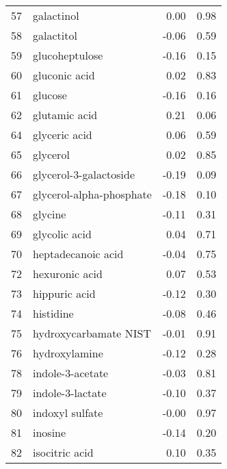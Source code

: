 \begin{tabular}{llrr}
57  &                         galactinol &                 0.00 &     0.98 \\
58  &                         galactitol &                -0.06 &     0.59 \\
59  &                     glucoheptulose &                -0.16 &     0.15 \\
60  &                      gluconic acid &                 0.02 &     0.83 \\
61  &                            glucose &                -0.16 &     0.16 \\
62  &                      glutamic acid &                 0.21 &     0.06 \\
64  &                      glyceric acid &                 0.06 &     0.59 \\
65  &                           glycerol &                 0.02 &     0.85 \\
66  &             glycerol-3-galactoside &                -0.19 &     0.09 \\
67  &           glycerol-alpha-phosphate &                -0.18 &     0.10 \\
68  &                            glycine &                -0.11 &     0.31 \\
69  &                      glycolic acid &                 0.04 &     0.71 \\
70  &                 heptadecanoic acid &                -0.04 &     0.75 \\
72  &                     hexuronic acid &                 0.07 &     0.53 \\
73  &                      hippuric acid &                -0.12 &     0.30 \\
74  &                          histidine &                -0.08 &     0.46 \\
75  &              hydroxycarbamate NIST &                -0.01 &     0.91 \\
76  &                      hydroxylamine &                -0.12 &     0.28 \\
78  &                   indole-3-acetate &                -0.03 &     0.81 \\
79  &                   indole-3-lactate &                -0.10 &     0.37 \\
80  &                    indoxyl sulfate &                -0.00 &     0.97 \\
81  &                            inosine &                -0.14 &     0.20 \\
82  &                     isocitric acid &                 0.10 &     0.35 \\

\end{tabular}
